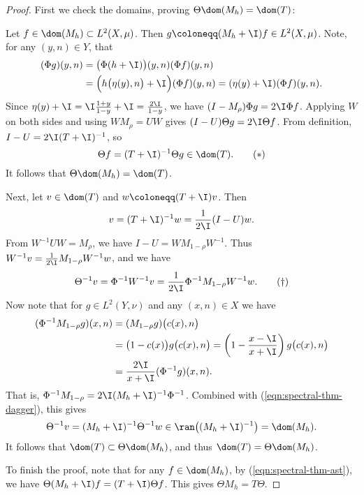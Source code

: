 \documentclass[oneside,reqno,letterpaper]{amsart}
\begin{document}
\begin{proof}
  \noindent
  First we check the domains, proving \(\Theta \dom(M_{h}) = \dom(T)\):
  
  Let \(f \in \dom(M_{h}) \subset L^2(X, \mu)\). 
  Then \(g \coloneqq (M_{h} + \I) f \in L^2(X, \mu)\). 
  Note, for any \((y, n) \in Y\), that 
  \begin{align*}
    (\Phi g) (y, n) 
    &= \big(\Phi (h + \I) \big)(y, n) (\Phi f)(y, n) \\ 
    &= \Big( h\big(\eta(y), n\big) + \I \Big) (\Phi f)(y, n) = (\eta(y) + \I) (\Phi f) (y, n) . 
  \end{align*}
  Since \(\eta(y) + \I = \I \frac{1 + y}{1 - y} + \I = \frac{2 \I}{1 - y}\), we have \((I - M_{\rho}) \Phi g = 2\I \Phi f\). 
  Applying \(W\) on both sides and using  \(WM_{\rho} = UW\) gives \((I - U) \Theta g = 2 \I \Theta f\). 
  From definition, \(I - U = 2 \I (T + \I)^{-1}\), so 
  \begin{equation}
  \label{eqn:spectral-thm-ast}
    \Theta f = (T + \I)^{-1} \Theta g \in \dom(T) . 
    \tag{\(\ast\)}
  \end{equation}
  It follows that \(\Theta \dom(M_{h}) = \dom(T)\). 

  Next, let \(v \in \dom(T)\) and \(w \coloneqq (T + \I) v\). Then \[
    v = (T + \I)^{-1} w = \frac{1}{2 \I} (I - U) w . 
  \] 
  From \(W^{-1} U W = M_{\rho}\), we have \(I - U = W M_{1 - \rho} W^{-1}\).
  Thus \(W^{-1} v = \frac{1}{2 \I} M_{1 - \rho} W^{-1} w\), and we have 
  \begin{equation}
  \label{eqn:spectral-thm-dagger}
    \Theta^{-1} v = \Phi^{-1} W^{-1} v = \frac{1}{2 \I} \Phi^{-1} M_{1 - \rho} W^{-1} w . 
    \tag{\(\dagger\)}
  \end{equation}
  Now note that for \(g \in L^2(Y, \nu)\) and any \((x, n) \in X\) we have
  \begin{align*}
    (\Phi^{-1} M_{1 - \rho} g)(x, n) 
    &= (M_{1 - \rho} g) \big(c(x), n\big) \\
    &= \big(1 - c(x)\big) g\big( c(x), n \big) 
      = \left( 1 - \frac{x - \I}{x + \I} \right) g\big( c(x), n \big) \\ 
    &= \frac{2\I}{x + \I} (\Phi^{-1} g) (x, n) . 
  \end{align*}
  That is, \(\Phi^{-1} M_{1 - \rho} = 2 \I (M_{h} + \I)^{-1} \Phi^{-1}\). 
  Combined with (\ref{eqn:spectral-thm-dagger}), this gives  
  \[
    \Theta^{-1} v = (M_{h} + \I)^{-1} \Theta^{-1} w \in \ran\big((M_{h} + \I)^{-1}\big) = \dom(M_{h}) . 
  \] 
  It follows that \(\dom(T) \subset \Theta \dom(M_{h})\), and thus \(\dom(T) = \Theta \dom(M_{h})\). 

  To finish the proof, note that for any \(f \in \dom(M_{h})\), by (\ref{eqn:spectral-thm-ast}), we have \(\Theta (M_{h} + \I) f = (T + \I) \Theta f\).
  This gives \(\Theta M_{h} = T \Theta\). 
\end{proof}
\end{document}
